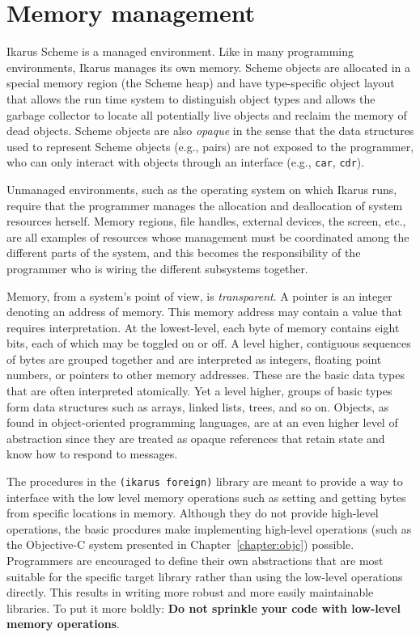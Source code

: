 \documentclass[onecolumn, 12pt, twoside, openright, dvipdfm]{book}
\begin{document}
\section{Memory management}

Ikarus Scheme is a managed environment.  Like in many programming
environments, Ikarus manages its own memory.  Scheme objects are
allocated in a special memory region (the Scheme heap) and have
type-specific object layout that allows the run time system to
distinguish object types and allows the garbage collector to locate
all potentially live objects and reclaim the memory of dead objects.
Scheme objects are also \emph{opaque} in the sense that the data
structures used to represent Scheme objects (e.g., pairs) are not
exposed to the programmer, who can only interact with objects
through an interface (e.g., \texttt{car}, \texttt{cdr}).  

Unmanaged environments, such as the operating system on which Ikarus
runs, require that the programmer manages the allocation and
deallocation of system resources herself.  Memory regions, file
handles, external devices, the screen, etc., are all examples of
resources whose management must be coordinated among the different
parts of the system, and this becomes the responsibility of the
programmer who is wiring the different subsystems together.

Memory, from a system's point of view, is \emph{transparent}.  A
pointer is an integer denoting an address of memory.  This memory
address may contain a value that requires interpretation.  At the
lowest-level, each byte of memory contains eight bits, each of which
may be toggled on or off.  A level higher, contiguous sequences of
bytes are grouped together and are interpreted as integers, floating
point numbers, or pointers to other memory addresses.  These are the
basic data types that are often interpreted atomically.  Yet a level
higher, groups of basic types form data structures such as arrays,
linked lists, trees, and so on.  Objects, as found in
object-oriented programming languages, are at an even higher level
of abstraction since they are treated as opaque references that
retain state and know how to respond to messages.

The procedures in the \texttt{(ikarus~foreign)} library are meant to
provide a way to interface with the low level memory operations such
as setting and getting bytes from specific locations in memory.
Although they do not provide high-level operations, the basic
procdures make implementing high-level operations (such as the
Objective-C system presented in Chapter~\ref{chapter:objc})
possible.  Programmers are encouraged to define their own
abstractions that are most suitable for the specific target library
rather than using the low-level operations directly.  This results
in writing more robust and more easily maintainable libraries.  To
put it more boldly: \textbf{Do not sprinkle your code with low-level
memory operations}.
\end{document}
